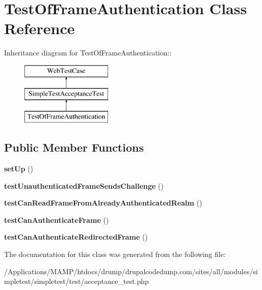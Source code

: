 \hypertarget{class_test_of_frame_authentication}{
\section{TestOfFrameAuthentication Class Reference}
\label{class_test_of_frame_authentication}
}
Inheritance diagram for TestOfFrameAuthentication::\begin{figure}[H]
\begin{center}
\leavevmode
\includegraphics[height=3cm]{class_test_of_frame_authentication}
\end{center}
\end{figure}
\subsection*{Public Member Functions}
\begin{DoxyCompactItemize}
\item 
\hypertarget{class_test_of_frame_authentication_ad2c18ecb2ea892cb25738df27f4d0063}{
{\bfseries setUp} ()}
\label{class_test_of_frame_authentication_ad2c18ecb2ea892cb25738df27f4d0063}

\item 
\hypertarget{class_test_of_frame_authentication_a126a4716891ae5a4d4377621bee9e499}{
{\bfseries testUnauthenticatedFrameSendsChallenge} ()}
\label{class_test_of_frame_authentication_a126a4716891ae5a4d4377621bee9e499}

\item 
\hypertarget{class_test_of_frame_authentication_affd26e0dd86b485abdf3435bb38c08da}{
{\bfseries testCanReadFrameFromAlreadyAuthenticatedRealm} ()}
\label{class_test_of_frame_authentication_affd26e0dd86b485abdf3435bb38c08da}

\item 
\hypertarget{class_test_of_frame_authentication_a3b7dd6da985a83d30422db19e7b17252}{
{\bfseries testCanAuthenticateFrame} ()}
\label{class_test_of_frame_authentication_a3b7dd6da985a83d30422db19e7b17252}

\item 
\hypertarget{class_test_of_frame_authentication_ad11f0e2bc04caa54a3b3bd922d481779}{
{\bfseries testCanAuthenticateRedirectedFrame} ()}
\label{class_test_of_frame_authentication_ad11f0e2bc04caa54a3b3bd922d481779}

\end{DoxyCompactItemize}


The documentation for this class was generated from the following file:\begin{DoxyCompactItemize}
\item 
/Applications/MAMP/htdocs/drump/drupalcodedump.com/sites/all/modules/simpletest/simpletest/test/acceptance\_\-test.php\end{DoxyCompactItemize}

